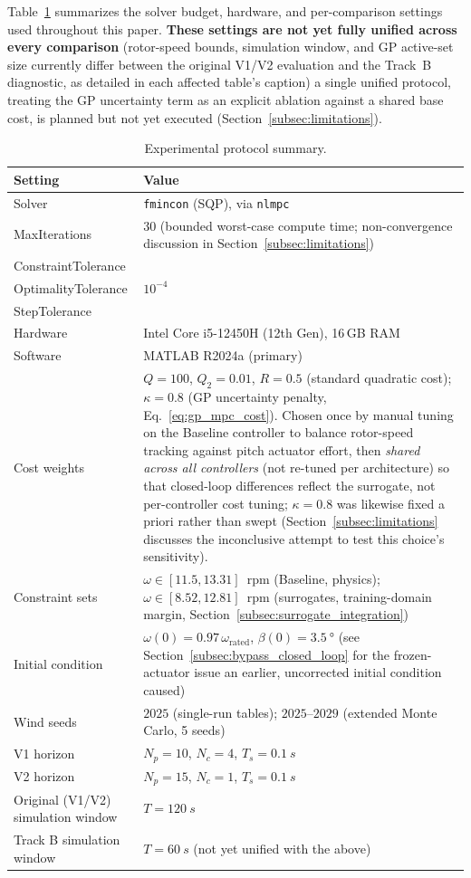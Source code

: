 Table~\ref{tab:protocol_summary} summarizes the solver budget,
hardware, and per-comparison settings used throughout this paper.
\textbf{These settings are not yet fully unified across every
comparison} (rotor-speed bounds, simulation window, and GP active-set
size currently differ between the original V1/V2 evaluation and the
Track~B diagnostic, as detailed in each affected table's caption) 
a single unified protocol, treating the GP uncertainty term as an
explicit ablation against a shared base cost, is planned but not yet
executed (Section~\ref{subsec:limitations}).


\begin{table}[H]
	\centering
	\caption{Experimental protocol summary.}
	\label{tab:protocol_summary}
	\begin{tabularx}{\textwidth}{l X}
		\toprule
		Setting & Value \\
		\midrule
		Solver & \texttt{fmincon} (SQP), via \texttt{nlmpc} \\
		MaxIterations & $30$ (bounded worst-case compute time; non-convergence discussion in Section~\ref{subsec:limitations}) \\
		ConstraintTolerance &  \\
		OptimalityTolerance & $10^{-4}$ \\
		StepTolerance & \\
		Hardware & Intel Core i5-12450H (12th Gen), 16\,GB RAM \\
		Software & MATLAB R2024a (primary) \\
		Cost weights & $Q=100$, $Q_2=0.01$, $R=0.5$ (standard quadratic cost); $\kappa=0.8$ (GP uncertainty penalty, Eq.~\ref{eq:gp_mpc_cost}). Chosen once by manual tuning on the Baseline controller to balance rotor-speed tracking against pitch actuator effort, then \emph{shared across all controllers} (not re-tuned per architecture) so that closed-loop differences reflect the surrogate, not per-controller cost tuning; $\kappa=0.8$ was likewise fixed a priori rather than swept (Section~\ref{subsec:limitations} discusses the inconclusive attempt to test this choice's sensitivity). \\
		Constraint sets & $\omega\in[11.5,13.31]$~rpm (Baseline, physics); $\omega\in[8.52,12.81]$~rpm (surrogates, training-domain margin, Section~\ref{subsec:surrogate_integration}) \\
		Initial condition & $\omega(0)=0.97\,\omega_{\text{rated}}$, $\beta(0)=\SI{3.5}{\degree}$ (see Section~\ref{subsec:bypass_closed_loop} for the frozen-actuator issue an earlier, uncorrected initial condition caused) \\
		Wind seeds & $2025$ (single-run tables); $2025$--$2029$ (extended Monte Carlo, 5 seeds) \\
		V1 horizon & $N_p=10$, $N_c=4$, $T_s=\SI{0.1}{s}$ \\
		V2 horizon & $N_p=15$, $N_c=1$, $T_s=\SI{0.1}{s}$ \\
		Original (V1/V2) simulation window & $T=\SI{120}{s}$ \\
		Track B simulation window & $T=\SI{60}{s}$ (not yet unified with the above) \\
		\bottomrule
	\end{tabularx}
\end{table}

